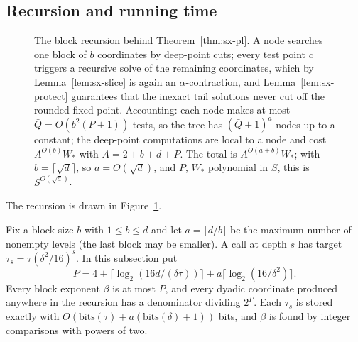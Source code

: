 \subsection{Recursion and running time}\label{sec:sx-time}

\begin{figure}[t]
\centering
{}
\caption{The block recursion behind Theorem~\ref{thm:sx-pl}. A node searches one block of $b$ coordinates
by deep-point cuts; every test point $c$ triggers a recursive solve of the remaining coordinates, which by
Lemma~\ref{lem:sx-slice} is again an $\alpha$-contraction, and Lemma~\ref{lem:sx-protect} guarantees that
the inexact tail solutions never cut off the rounded fixed point. Accounting: each node makes at most
$\bar Q=O(b^2(P+1))$ tests, so the tree has $(\bar Q+1)^a$ nodes up to a constant; the deep-point
computations are local to a node and cost $A^{O(b)}W_*$ with $A=2+b+d+P$. The total is $A^{O(a+b)}W_*$;
with $b=\lceil\sqrt d\rceil$, so $a=O(\sqrt d)$, and $P$, $W_*$ polynomial in $S$, this is
$S^{O(\sqrt d)}$.}
\label{fig:sx-tree}
\end{figure}

The recursion is drawn in Figure~\ref{fig:sx-tree}.

Fix a block size $b$ with $1\le b\le d$ and let $a=\lceil d/b\rceil$ be the maximum number of nonempty
levels (the last block may be smaller). A call at depth $s$ has target $\tau_s=\tau(\delta^2/16)^s$. In
this subsection put
\[
  P=4+\lceil\log_2(16d/(\delta\tau))\rceil+a\lceil\log_2(16/\delta^2)\rceil .
\]
Every block exponent $\beta$ is at most $P$, and every dyadic coordinate produced anywhere in the
recursion has a denominator dividing $2^P$. Each $\tau_s$ is stored exactly with
$O(\mathrm{bits}(\tau)+a(\mathrm{bits}(\delta)+1))$ bits, and $\beta$ is found by integer comparisons with
powers of two.


